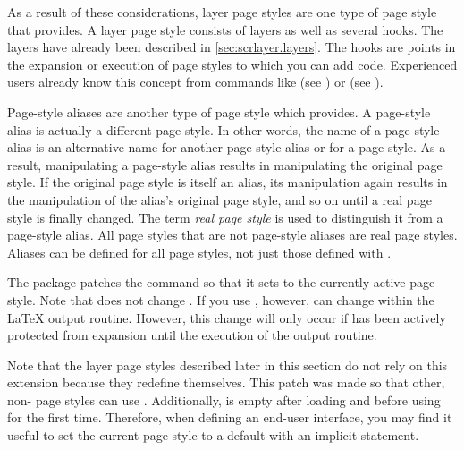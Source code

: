 As a result of these considerations, layer page
styles%
 are one type of page style that 
 provides. A layer page style consists of layers as well as
several hooks. The layers have already been described in
\autoref{sec:scrlayer.layers}. The hooks%
 are points in the expansion or execution of page styles to
which you can add code. Experienced users already know this concept from
commands like  (see \cite{latex:usrguide}) or
 (see
).

Page-style aliases are another type of page style which 
provides. A page-style alias is actually a different page style. In other
words, the name of a page-style alias is an alternative name for another
page-style alias or for a page style. As a result, manipulating a page-style
alias results in manipulating the original page style. If the original page
style is itself an alias, its manipulation again results in the manipulation
of the alias's original page style, and so on until a real page style is
finally changed. The term \emph{real page style} is
used to distinguish it from a page-style alias. All page styles that are not
page-style aliases are real page styles. Aliases can be defined for all page
styles, not just those defined with .

\begin{Declaration}
\end{Declaration}
The  package patches the 
command so that it sets  to the currently active page
style. Note that  does not change
. If you use ,
however,  can change within the \LaTeX{} output
routine. However, this change will only occur if  has
been actively protected from expansion until the execution of the output
routine.

Note that the layer page styles described later in this section do not rely on
this  extension because they redefine
 themselves. This patch was made so that other,
non- page styles can use .
Additionally,  is empty after loading
 and before using  for the
first time. Therefore, when defining an end-user interface, you may find it
useful to set the current page style to a default with an implicit
 statement.%
\EndIndexGroup


